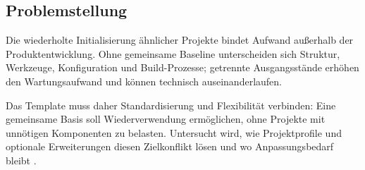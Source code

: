\subsection{Problemstellung}
\label{subsec:problemstellung}

Die wiederholte Initialisierung ähnlicher Projekte bindet Aufwand außerhalb der
Produktentwicklung. Ohne gemeinsame Baseline unterscheiden sich Struktur,
Werkzeuge, Konfiguration und Build-Prozesse; getrennte Ausgangsstände erhöhen
den Wartungsaufwand und können technisch auseinanderlaufen.

Das Template muss daher Standardisierung und Flexibilität verbinden: Eine
gemeinsame Basis soll Wiederverwendung ermöglichen, ohne Projekte mit
unnötigen Komponenten zu belasten. Untersucht wird, wie Projektprofile und
optionale Erweiterungen diesen Zielkonflikt lösen und wo Anpassungsbedarf bleibt
\parencite{kleiveist2026architecture,kleiveist2026profiles}.
